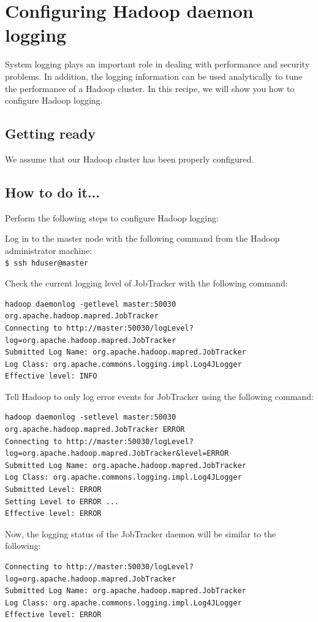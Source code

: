 \section{Configuring Hadoop daemon logging}
System logging plays an important role in dealing with performance and security problems. In addition, the logging information can be used analytically to tune the performance of a Hadoop cluster. In this recipe, we will show you how to configure Hadoop logging.

\subsection*{Getting ready}
We assume that our Hadoop cluster has been properly configured.

\subsection*{How to do it...}
Perform the following steps to configure Hadoop logging: 

Log in to the master node with the following command from the Hadoop administrator machine: \\ 
\verb|$ ssh hduser@master|

Check the current logging level of JobTracker with the following command:
\begin{verbatim}
hadoop daemonlog -getlevel master:50030 org.apache.hadoop.mapred.JobTracker
Connecting to http://master:50030/logLevel?log=org.apache.hadoop.mapred.JobTracker
Submitted Log Name: org.apache.hadoop.mapred.JobTracker
Log Class: org.apache.commons.logging.impl.Log4JLogger
Effective level: INFO
\end{verbatim}

Tell Hadoop to only log error events for JobTracker using the following command:
\begin{verbatim}
hadoop daemonlog -setlevel master:50030 org.apache.hadoop.mapred.JobTracker ERROR
Connecting to http://master:50030/logLevel?log=org.apache.hadoop.mapred.JobTracker&level=ERROR
Submitted Log Name: org.apache.hadoop.mapred.JobTracker
Log Class: org.apache.commons.logging.impl.Log4JLogger
Submitted Level: ERROR
Setting Level to ERROR ...
Effective level: ERROR
\end{verbatim}
Now, the logging status of the JobTracker daemon will be similar to the following:
\begin{verbatim}
Connecting to http://master:50030/logLevel?log=org.apache.hadoop.mapred.JobTracker
Submitted Log Name: org.apache.hadoop.mapred.JobTracker
Log Class: org.apache.commons.logging.impl.Log4JLogger
Effective level: ERROR
\end{verbatim}

